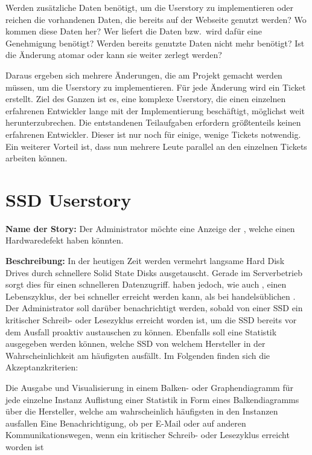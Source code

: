 \begin{outline}
  \1 Werden zusätzliche Daten benötigt, um die Userstory zu implementieren oder
  reichen die vorhandenen Daten, die bereits auf der Webseite genutzt werden?
  \1 Wo kommen diese Daten her?
  \1 Wer liefert die Daten bzw.\ wird dafür eine Genehmigung benötigt?
  \1 Werden bereits genutzte Daten nicht mehr benötigt?
  \1 Ist die Änderung atomar oder kann sie weiter zerlegt werden?
\end{outline}

Daraus ergeben sich mehrere Änderungen, die am Projekt gemacht werden müssen,
um die Userstory zu implementieren. Für jede Änderung wird ein Ticket erstellt.
Ziel des Ganzen ist es, eine komplexe Userstory, die einen einzelnen erfahrenen
Entwickler lange mit der Implementierung beschäftigt, möglichst weit
herunterzubrechen. Die entstandenen Teilaufgaben erfordern größtenteils keinen
erfahrenen Entwickler. Dieser ist nur noch für einige, wenige Tickets
notwendig. Ein weiterer Vorteil ist, dass nun mehrere Leute parallel an den
einzelnen Tickets arbeiten können.
\tm%

\section{SSD Userstory}
\textbf{Name der Story:} Der Administrator möchte eine Anzeige der
, welche einen Hardwaredefekt haben könnten.

\textbf{Beschreibung:} In der heutigen Zeit werden vermehrt langsame Hard Disk
Drives durch schnellere Solid State Disks ausgetauscht. Gerade im Serverbetrieb
sorgt dies für einen schnelleren Datenzugriff.  haben
jedoch, wie auch , einen Lebenszyklus, der bei
 schneller erreicht werden kann, als bei handelsüblichen
. Der Administrator soll darüber benachrichtigt werden,
sobald von einer \gls{SSD} ein kritischer Schreib\hyp{} oder Lesezyklus
erreicht worden ist, um die \gls{SSD} bereits vor dem Ausfall proaktiv
austauschen zu können. Ebenfalls soll eine Statistik ausgegeben werden können,
welche \gls{SSD} von welchem Hersteller in der Wahrscheinlichkeit am häufigsten
ausfällt. Im Folgenden finden sich die Akzeptanzkriterien:

\begin{outline}
  \1 Die Ausgabe und Visualisierung in einem Balken\hyp{} oder Graphendiagramm
  für jede einzelne Instanz
  \1 Auflistung einer Statistik in Form eines Balkendiagramms über die
  Hersteller, welche am wahrscheinlich häufigsten in den Instanzen ausfallen
  \1 Eine Benachrichtigung, ob per E\hyp{}Mail oder auf anderen
  Kommunikationswegen, wenn ein kritischer Schreib\hyp{} oder Lesezyklus
  erreicht worden ist
\end{outline}

